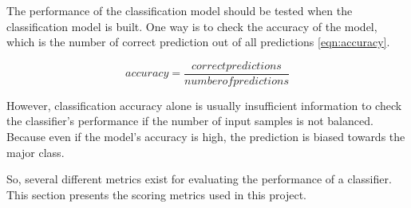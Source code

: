 The performance of the classification model should be tested when the classification model is built. One way is to check the accuracy of the model, which is the number of correct prediction out of all predictions \ref{eqn:accuracy}. 


\begin{equation}
\label{eqn:accuracy}
accuracy = \frac{correct predictions}{number of predictions}
\end{equation}

However, classification accuracy alone is usually insufficient information to check the classifier's performance if the number of input samples is not balanced. Because even if the model's accuracy is high, the prediction is biased towards the major class. 

So, several different metrics exist for evaluating the performance of a classifier. This section presents the scoring metrics used in this project.

